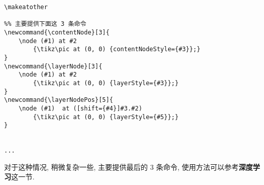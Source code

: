 \begin{verbatim}
\makeatother

%% 主要提供下面这 3 条命令
\newcommand{\contentNode}[3]{
	\node (#1) at #2 
		{\tikz\pic at (0, 0) {contentNodeStyle={#3}};}
}
\newcommand{\layerNode}[3]{
	\node (#1) at #2 
		{\tikz\pic at (0, 0) {layerStyle={#3}};}
}
\newcommand{\layerNodePos}[5]{
	\node (#1)  at ([shift={#4}]#3.#2) 
		{\tikz\pic at (0, 0) {layerStyle={#5}};}
}


...

\end{verbatim}

对于这种情况, 稍微复杂一些, 主要提供最后的 3 条命令, 使用方法可以参考\textbf{深度学习}这一节.
